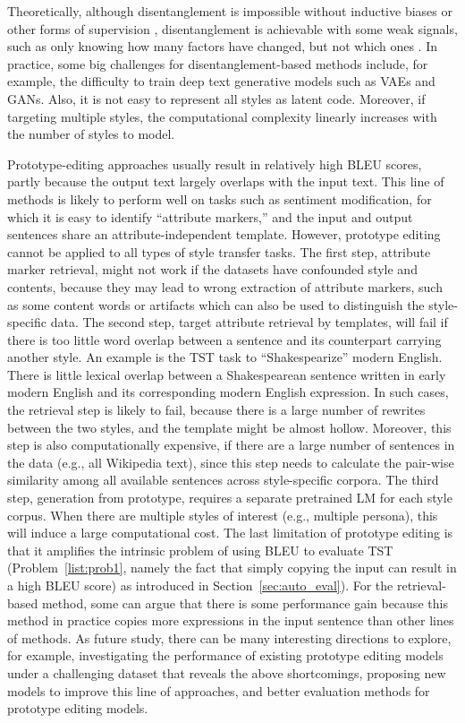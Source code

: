 Theoretically, although disentanglement is impossible without inductive biases or other forms of supervision , disentanglement is achievable with some weak signals, such as only knowing how many factors have changed, but not which ones . 
In practice, some big challenges for disentanglement-based methods include, for example, the difficulty to train deep text generative models such as VAEs and GANs. Also, it is not easy to represent all styles as latent code. Moreover, if targeting multiple styles, the computational complexity linearly increases with the number of styles to model.

Prototype-editing approaches usually result in relatively high BLEU scores, partly because the output text largely overlaps with the input text. This line of methods is likely to perform well on tasks such as sentiment modification, for which it is easy to identify ``attribute markers,'' and the input and output sentences share an attribute-independent template.
However, prototype editing cannot be applied  to all types of style transfer tasks. The first step, attribute marker retrieval, might not work if the datasets have confounded style and contents, because they may lead to wrong extraction of attribute markers, such as some content words or artifacts which can also be used to distinguish the style-specific data.
The second step, target attribute retrieval by templates, will fail if there is too little word overlap between a sentence and its counterpart carrying another style.
An example is the TST task to ``Shakespearize'' modern English. There is little lexical overlap between a Shakespearean sentence written in early modern English and its corresponding modern English expression. In such cases, the retrieval step is likely to fail, because there is a large number of rewrites between the two styles, and the template might be almost hollow. Moreover, this step is also computationally expensive, if there are a large number of sentences in the data (e.g., all Wikipedia text), since this step needs to calculate the pair-wise similarity among all available sentences across style-specific corpora.
The third step, generation from prototype, requires a separate pretrained LM for each style corpus. When there are multiple styles of interest (e.g., multiple persona), this will induce a large computational cost.
The last limitation of prototype editing is that it amplifies the intrinsic problem of using BLEU to evaluate TST (Problem~\ref{list:prob1}, namely the fact that simply copying the input can result in a high BLEU score) as introduced in Section~\ref{sec:auto_eval}).
For the retrieval-based method, some can argue that there is some performance gain because this method in practice copies more expressions in the input sentence than other lines of methods.
As future study, there can be many interesting directions to explore, for example, investigating the performance of existing prototype editing models under a challenging dataset that reveals the above shortcomings, proposing new models to improve this line of approaches, and better evaluation methods for prototype editing models.

